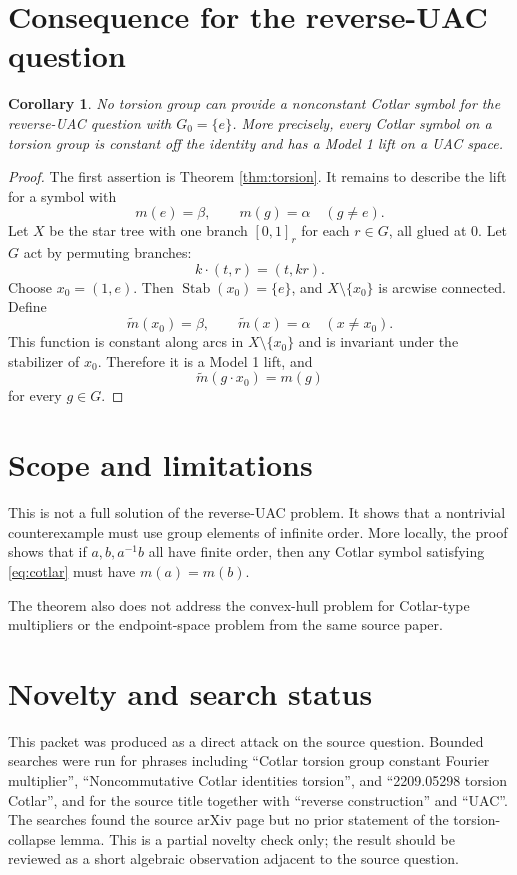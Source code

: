 \documentclass[11pt]{article}
\newtheorem{corollary}{Corollary}
\DeclareMathOperator{\Stab}{Stab}
\begin{document}
\section*{Consequence for the reverse-UAC question}

\begin{corollary}
No torsion group can provide a nonconstant Cotlar symbol for the reverse-UAC
question with \(G_0=\{e\}\). More precisely, every Cotlar symbol on a torsion
group is constant off the identity and has a Model 1 lift on a UAC space.
\end{corollary}

\begin{proof}
The first assertion is Theorem \ref{thm:torsion}. It remains to describe the
lift for a symbol with
\[
  m(e)=\beta,\qquad m(g)=\alpha\quad(g\ne e).
\]
Let \(X\) be the star tree with one branch \([0,1]_r\) for each \(r\in G\),
all glued at \(0\). Let \(G\) act by permuting branches:
\[
  k\cdot (t,r)=(t,kr).
\]
Choose \(x_0=(1,e)\). Then \(\Stab(x_0)=\{e\}\), and \(X\setminus\{x_0\}\)
is arcwise connected. Define
\[
  \widetilde m(x_0)=\beta,\qquad
  \widetilde m(x)=\alpha\quad(x\ne x_0).
\]
This function is constant along arcs in \(X\setminus\{x_0\}\) and is invariant
under the stabilizer of \(x_0\). Therefore it is a Model 1 lift, and
\[
  \widetilde m(g\cdot x_0)=m(g)
\]
for every \(g\in G\).
\end{proof}

\section*{Scope and limitations}

This is not a full solution of the reverse-UAC problem. It shows that a
nontrivial counterexample must use group elements of infinite order. More
locally, the proof shows that if \(a,b,a^{-1}b\) all have finite order, then
any Cotlar symbol satisfying \eqref{eq:cotlar} must have \(m(a)=m(b)\).

The theorem also does not address the convex-hull problem for Cotlar-type
multipliers or the endpoint-space problem from the same source paper.

\section*{Novelty and search status}

This packet was produced as a direct attack on the source question. Bounded
searches were run for phrases including ``Cotlar torsion group constant
Fourier multiplier'', ``Noncommutative Cotlar identities torsion'', and
``2209.05298 torsion Cotlar'', and for the source title together with
``reverse construction'' and ``UAC''. The searches found the source arXiv page
but no prior statement of the torsion-collapse lemma. This is a partial
novelty check only; the result should be reviewed as a short algebraic
observation adjacent to the source question.
\end{document}
